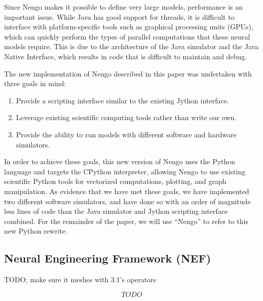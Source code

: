 \documentclass{frontiersSCNS}
\begin{document}
Since Nengo makes it possible to define
very large models,
performance is an important issue.
While Java has good support for threads,
it is difficult to interface with
platform-specific tools such as
graphical processing units (GPUs),
which can quickly perform the types of parallel
computations that these neural models require.
This is due to the
architecture of the Java simulator
and the Java Native Interface,
which results in code that
is difficult to maintain and debug.

The new implementation of Nengo described in this paper
was undertaken with three goals in mind:
\begin{enumerate}
  \item Provide a scripting interface
    similar to the existing Jython interface.
  \item Leverage existing scientific computing tools
    rather than write our own.
  \item Provide the ability to run models with
    different software and hardware simulators.
\end{enumerate}

In order to achieve these goals,
this new version of Nengo uses the Python language
and targets the CPython interpreter,
allowing Nengo to use existing scientific Python
tools for vectorized computations, plotting, and graph manipulation.
As evidence that we have met these goals,
we have implemented two different software simulators,
and have done so with an order of magnitude
less lines of code than the Java simulator
and Jython scripting interface combined.
For the remainder of the paper,
we will use ``Nengo'' to refer to
this new Python rewrite.

\subsection{Neural Engineering Framework (NEF)}

TODO; make sure it meshes with 3.1's operators

\begin{equation} \label{TODO}
  TODO
\end{equation}



\end{document}
